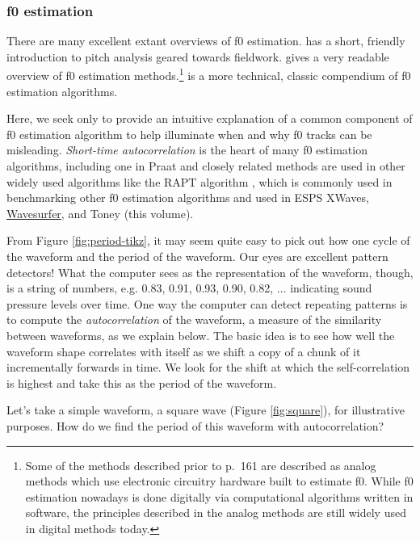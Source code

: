 \documentclass[12pt]{article}
\begin{document}
\subsubsection{f0 estimation}
\label{sec:f0-estimation}

There are many excellent extant overviews of f0
estimation. \citet[Ch.\ 3]{Ladefoged:2003} has a short, friendly
introduction to pitch analysis geared towards fieldwork.  \citet[p.\
153--167]{Baken:2000a} gives a very readable overview of f0 estimation
methods.\footnote{Some of the methods described prior to p.\ 161 are
described as analog methods which use electronic circuitry hardware
built to estimate f0. While f0 estimation nowadays is done digitally
via computational algorithms written in software, the principles
described in the analog methods are still widely used in digital
methods today.} \citet{hess:1983} is a more technical, classic
compendium of f0 estimation algorithms. 

Here, we seek only to provide
an intuitive explanation of a common component of f0 estimation algorithm to help
illuminate when and why f0 tracks can be
misleading. \textit{Short-time autocorrelation} is the heart of many f0
estimation algorithms, including one in Praat
\citep{Boersma:1993,Boersma:2010} and closely related methods are used
in other widely used algorithms like the RAPT algorithm
\citep{Talkin:1995}, which is commonly used in benchmarking other f0
estimation algorithms and used in ESPS XWaves,
\href{http://sourceforge.net/projects/wavesurfer/}{Wavesurfer}, and
Toney (this volume).

From Figure \ref{fig:period-tikz}, it may seem quite easy to pick out
how one cycle of the waveform and the period of the waveform. Our eyes
are excellent pattern detectors! What the computer sees as the
representation of the waveform, though, is a string of numbers,
e.g. 0.83, 0.91, 0.93, 0.90, 0.82, $\ldots$ indicating sound pressure
levels over time. One way the computer can detect repeating patterns
is to compute the \textit{autocorrelation} of the waveform, a measure
of the similarity between waveforms, as we explain below. The basic
idea is to see how well the waveform shape correlates with itself as
we shift a copy of a chunk of it incrementally forwards in time. We
look for the shift at which the self-correlation is highest and take
this as the period of the waveform.
 
Let's take a simple waveform, a square wave (Figure \ref{fig:square}),
for illustrative purposes. How do we find the period of this waveform
with autocorrelation? 
\end{document}
